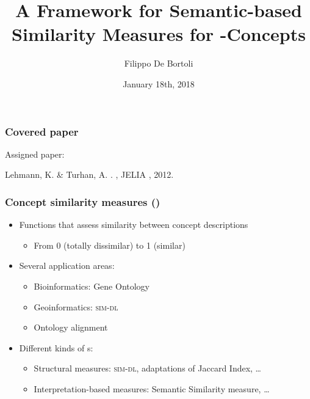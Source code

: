 \documentclass[smaller, dvipsnames]{beamer}
\title{A Framework for Semantic-based Similarity Measures for \elh-Concepts}
\author{Filippo De Bortoli}
\institute{European Master's Program in Computational Logic, TU Dresden}
\date{January 18th, 2018}
\begin{document}
\maketitle

\begin{frame}
  \frametitle{Covered paper}
  Assigned paper:
  \begin{thebibliography}
    \bibitem{}
     Lehmann, K. \& Turhan, A.
	   .
	   , {JELIA} , 2012.
  \end{thebibliography}
\end{frame}

\begin{frame}
  \frametitle{Concept similarity measures (\csm)}
  \begin{itemize}
    \item Functions that assess similarity between concept descriptions
    \begin{itemize}
      \item From 0 (totally dissimilar) to 1 (similar)
    \end{itemize}
    \item Several application areas:
    \begin{itemize}
      \item Bioinformatics: Gene Ontology
      \item Geoinformatics: \textsc{sim-dl}
      \item Ontology alignment
    \end{itemize}
    \item Different kinds of \csm{}s:
    \begin{itemize}
      \item \alert{Structural} measures: \textsc{sim-dl}, adaptations of Jaccard Index, \ldots
      \item \alert{Interpretation-based} measures: Semantic Similarity measure, \ldots
    \end{itemize}
  \end{itemize}
\end{frame}
\end{document}

